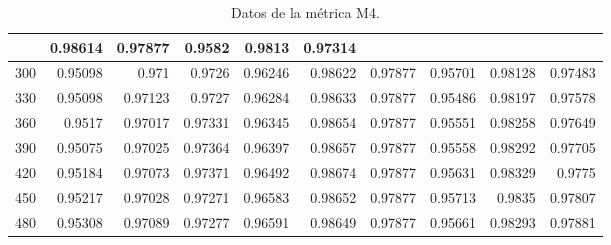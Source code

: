 \begin{table}[h]
\begin{tabular}{|r|r|r|r|r|r|r|r|r|r|}
        &{\tiny 0.98614}    &{\tiny 0.97877}    &{\tiny 0.9582}    &{\tiny 0.9813}    &{\tiny 0.97314} \\
        \hline \tiny 300 &{\tiny 0.95098}    &{\tiny 0.971}    &{\tiny 0.9726}    &{\tiny 0.96246}
        &{\tiny 0.98622}    &{\tiny 0.97877}    &{\tiny 0.95701}    &{\tiny 0.98128}    &{\tiny 0.97483} \\
        \hline \tiny 330 &{\tiny 0.95098}    &{\tiny 0.97123}    &{\tiny 0.9727}    &{\tiny
        0.96284}    &{\tiny 0.98633}    &{\tiny 0.97877}    &{\tiny 0.95486}    &{\tiny 0.98197}
        &{\tiny 0.97578} \\
        \hline \tiny 360 &{\tiny 0.9517}    &{\tiny 0.97017}    &{\tiny 0.97331}    &{\tiny
        0.96345}    &{\tiny 0.98654}    &{\tiny 0.97877}    &{\tiny 0.95551}    &{\tiny 0.98258}
        &{\tiny 0.97649} \\
        \hline \tiny 390 &{\tiny 0.95075}    &{\tiny 0.97025}    &{\tiny 0.97364}    &{\tiny
        0.96397}    &{\tiny 0.98657}    &{\tiny 0.97877}    &{\tiny 0.95558}    &{\tiny 0.98292}
        &{\tiny 0.97705} \\
        \hline \tiny 420 &{\tiny 0.95184}    &{\tiny 0.97073}    &{\tiny 0.97371}    &{\tiny
        0.96492}    &{\tiny 0.98674}    &{\tiny 0.97877}    &{\tiny 0.95631}    &{\tiny 0.98329}
        &{\tiny 0.9775} \\
        \hline \tiny 450 &{\tiny 0.95217}    &{\tiny 0.97028}    &{\tiny 0.97271}    &{\tiny
        0.96583}    &{\tiny 0.98652}    &{\tiny 0.97877}    &{\tiny 0.95713}    &{\tiny 0.9835}
        &{\tiny 0.97807} \\
        \hline \tiny 480 &{\tiny 0.95308}    &{\tiny 0.97089}    &{\tiny 0.97277}    &{\tiny
        0.96591}    &{\tiny 0.98649}    &{\tiny 0.97877}    &{\tiny 0.95661}    &{\tiny 0.98293}
        &{\tiny 0.97881} \\
        \hline
    \end{tabular}
    \caption{Datos de la m\'etrica M4.}
    \label{tabA4}
\end{table}

